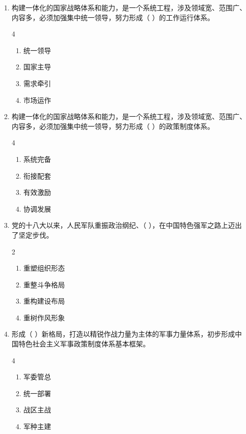 \documentclass[a4paper,11pt]{ctexart}
\begin{document}
\begin{enumerate}
    \item 构建一体化的国家战略体系和能力，是一个系统工程，涉及领域宽、范围广、内容多，必须加强集中统一领导，努力形成（ ）的工作运行体系。
    \begin{multicols}{4}
    \begin{enumerate}
        \item 统一领导
        \item 国家主导
        \item 需求牵引
        \item 市场运作
    \end{enumerate}
    \end{multicols}

    \item 构建一体化的国家战略体系和能力，是一个系统工程，涉及领域宽、范围广、内容多，必须加强集中统一领导，努力形成（ ）的政策制度体系。
    \begin{multicols}{4}
    \begin{enumerate}
        \item 系统完备
        \item 衔接配套
        \item 有效激励
        \item 协调发展
    \end{enumerate}
    \end{multicols}

    \item 党的十八大以来，人民军队重振政治纲纪、（ ），在中国特色强军之路上迈出了坚定步伐。
    \begin{multicols}{2}
    \begin{enumerate}
        \item 重塑组织形态
        \item 重整斗争格局
        \item 重构建设布局
        \item 重树作风形象
    \end{enumerate}
    \end{multicols}

    \item 形成（ ）新格局，打造以精锐作战力量为主体的军事力量体系，初步形成中国特色社会主义军事政策制度体系基本框架。
    \begin{multicols}{4}
    \begin{enumerate}
        \item 军委管总
        \item 统一部署
        \item 战区主战
        \item 军种主建
    \end{enumerate}
    \end{multicols}
\end{enumerate}
\end{document}
